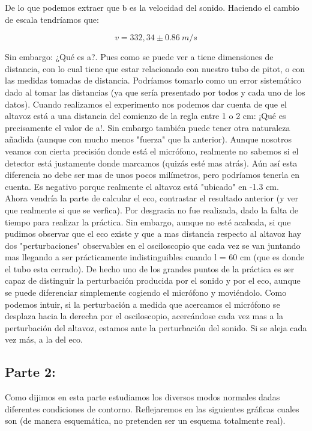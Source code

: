 \documentclass[12pt,a4paper]{article}
\begin{document}
De lo que podemos extraer que b es la velocidad del sonido. Haciendo el cambio de escala tendríamos que:

$$ v = 332,34 \pm 0.86  \ m/s$$

Sin embargo: ¿Qué es a?. Pues como se puede ver a tiene dimensiones de distancia, con lo cual tiene que estar relacionado con nuestro tubo de pitot, o con las medidas tomadas de distancia. Podríamos tomarlo como un error sistemático dado al tomar las distancias (ya que sería presentado por todos y cada uno de los datos). Cuando realizamos el experimento nos podemos dar cuenta de que el altavoz está a una distancia del comienzo de la regla entre 1 o 2 cm: ¡Qué es precisamente el valor de a!. Sin embargo también puede tener otra naturaleza añadida (aunque con mucho menos "fuerza" que la anterior). Aunque nosotros veamos con cierta precisión donde está el micrófono, realmente no sabemos si el detector está justamente donde marcamos (quizás esté mas atrás). Aún así esta diferencia no debe ser mas de unos pocos milímetros, pero podríamos tenerla en cuenta. Es negativo porque realmente el altavoz está "ubicado" en -1.3 cm. \\


Ahora vendría la parte de calcular el eco, contrastar el resultado anterior (y ver que realmente si que se verfica). Por desgracia no fue realizada, dado la falta de tiempo para realizar la práctica. Sin embargo, aunque no esté acabada, si que pudimos observar que el eco existe y que a mas distancia respecto al altavoz hay dos "perturbaciones" observables en el osciloscopio que cada vez se van juntando mas llegando a ser prácticamente indistinguibles cuando l =  60 cm (que es donde el tubo esta cerrado). De hecho uno de los grandes puntos de la práctica es ser capaz de distinguir la perturbación producida por el sonido y por el eco, aunque se puede diferenciar simplemente cogiendo el micrófono y moviéndolo. Como podemos intuir, si la perturbación a medida que acercamos el micrófono se desplaza hacia la derecha por el osciloscopio, acercándose cada vez mas a la perturbación del altavoz, estamos ante la perturbación del sonido. Si se aleja cada vez más, a la del eco. 

\subsection{Parte 2:}
Como dijimos en esta parte estudiamos los diversos modos normales dadas diferentes condiciones de contorno. Reflejaremos en las siguientes gráficas cuales son (de manera esquemática, no pretenden ser un esquema totalmente real). \\
\end{document}
